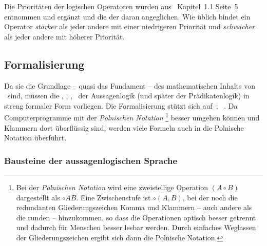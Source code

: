 Die Prioritäten der logischen Operatoren wurden aus~\cite{bib:Rautenberg} Kapitel~1.1 Seite~5 entnommen und ergänzt und die der  daran angeglichen.
Wie üblich bindet ein Operator \emph{stärker} als jeder andere mit einer niedrigeren Priorität und \emph{schwächer} als jeder andere mit höherer Priorität.

\subsection{Formalisierung}%
\label{sub:Formalisierung}

Da sie die Grundlage -- quasi das Fundament -- des mathematischen Inhalts von \ASBA\ sind, müssen die , , , \textusw\ der Aussagenlogik (und später der Prädikatenlogik) in streng formaler Form vorliegen.
Die Formalisierung stützt sich auf~\cite{bib:Aussagenlogik}; \alsoname~\cite{bib:LogikDe, bib:LogikEn}.
Da Computerprogramme mit der \emph{Polnischen Notation}%
\footnote{%
	Bei der \emph{Polnischen Notation} wird eine zweistellige Operation $(A\circ B)$ dargestellt als $\circ A B$.
	Eine Zwischenstufe ist $\circ(A,B)$, bei der noch die redundanten Gliederungszeichen Komma und Klammern -- auch andere als die runden -- hinzukommen, so dass die Operationen optisch besser getrennt und dadurch für Menschen besser lesbar werden.
	Durch einfaches Weglassen der Gliederungszeichen ergibt sich dann die Polnische Notation.%
}
besser umgehen können und Klammern dort überflüssig sind, werden viele Formeln auch in die Polnische Notation überführt.

\subsubsection{Bausteine der aussagenlogischen Sprache}%
\label{subsub:Bausteine}

